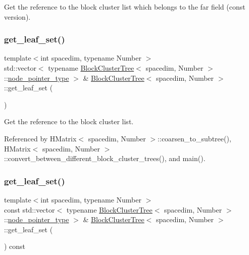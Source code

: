Get the reference to the block cluster list which belongs to the far field (const version). \mbox{\label{classBlockClusterTree_a162b396d814b420f96289425529852e9}} 
\subsubsection{\texorpdfstring{get\+\_\+leaf\+\_\+set()}{get\_leaf\_set()}\hspace{0.1cm}{\footnotesize\ttfamily [1/2]}}
{\footnotesize\ttfamily template$<$int spacedim, typename Number $>$ \\
std\+::vector$<$ typename \hyperlink{classBlockClusterTree}{Block\+Cluster\+Tree}$<$ spacedim, Number $>$\+::\hyperlink{classTreeNode}{node\+\_\+pointer\+\_\+type} $>$ \& \hyperlink{classBlockClusterTree}{Block\+Cluster\+Tree}$<$ spacedim, Number $>$\+::get\+\_\+leaf\+\_\+set (\begin{DoxyParamCaption}{ }\end{DoxyParamCaption})}

Get the reference to the block cluster list. 

Referenced by H\+Matrix$<$ spacedim, Number $>$\+::coarsen\+\_\+to\+\_\+subtree(), H\+Matrix$<$ spacedim, Number $>$\+::convert\+\_\+between\+\_\+different\+\_\+block\+\_\+cluster\+\_\+trees(), and main().

\mbox{\label{classBlockClusterTree_a38c3d1ad3aa983ea1d0b711914664b4c}} 
\subsubsection{\texorpdfstring{get\+\_\+leaf\+\_\+set()}{get\_leaf\_set()}\hspace{0.1cm}{\footnotesize\ttfamily [2/2]}}
{\footnotesize\ttfamily template$<$int spacedim, typename Number $>$ \\
const std\+::vector$<$ typename \hyperlink{classBlockClusterTree}{Block\+Cluster\+Tree}$<$ spacedim, Number $>$\+::\hyperlink{classTreeNode}{node\+\_\+pointer\+\_\+type} $>$ \& \hyperlink{classBlockClusterTree}{Block\+Cluster\+Tree}$<$ spacedim, Number $>$\+::get\+\_\+leaf\+\_\+set (\begin{DoxyParamCaption}{ }\end{DoxyParamCaption}) const}

